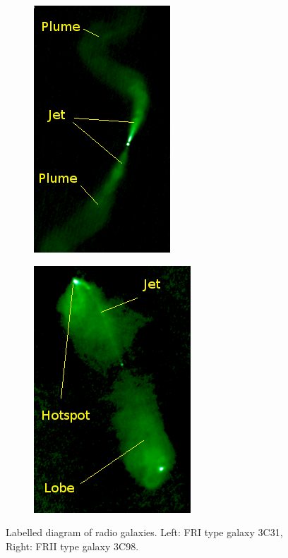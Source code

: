 \documentclass[a4paper, 10pt]{article}
\begin{document}
\begin{figure}[H]
\centering
\begin{subfigure}[b]{0.49\textwidth}
	\centering
	\includegraphics[height=\textwidth]{fr2}
\end{subfigure}
\begin{subfigure}[b]{0.49\textwidth}
	\centering
	\includegraphics[height=\textwidth]{fr1}
\end{subfigure}

\caption{Labelled diagram of radio galaxies. Left: FRI type galaxy 3C31, Right: FRII type galaxy 3C98\footnotemark.}
\label{fr}
\end{figure}
\end{document}
